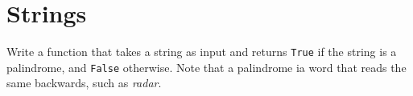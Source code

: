 \section{Strings} %
\label{sec:strings}
\begin{questions}
\label{sub:palindrome}

Write a function that takes a string as input and returns \texttt{True} if
the string is a palindrome, and \texttt{False} otherwise.
Note that a palindrome ia word that reads the same backwards, such as \emph{radar}.

\end{questions}

